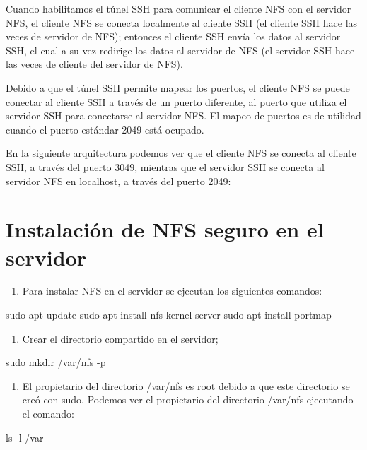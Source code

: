Cuando habilitamos el túnel SSH para comunicar el cliente NFS con el servidor NFS, el cliente NFS se conecta localmente al cliente SSH (el cliente SSH hace las veces de servidor de NFS); entonces el cliente SSH envía los datos al servidor SSH, el cual a su vez redirige los datos al servidor de NFS (el servidor SSH hace las veces de cliente del servidor de NFS).

Debido a que el túnel SSH permite mapear los puertos, el cliente NFS se puede conectar al cliente SSH a través de un puerto diferente, al puerto que utiliza el servidor SSH para conectarse al servidor NFS. El mapeo de puertos es de utilidad cuando el puerto estándar 2049 está ocupado.

En la siguiente arquitectura podemos ver que el cliente NFS se conecta al cliente SSH, a través del puerto 3049, mientras que el servidor SSH se conecta al servidor NFS en localhost, a través del puerto 2049:

\section{Instalación de NFS seguro en el servidor}

\begin{enumerate}
\item Para instalar NFS en el servidor se ejecutan los siguientes comandos:
\end{enumerate}

\begin{SourceCode}
sudo apt update
sudo apt install nfs-kernel-server
sudo apt install portmap
\end{SourceCode}

\begin{enumerate}
\item Crear el directorio compartido en el servidor;
\end{enumerate}

\begin{SourceCode}
sudo mkdir /var/nfs -p
\end{SourceCode}

\begin{enumerate}
\item El propietario del directorio /var/nfs es root debido a que este directorio se creó con sudo. Podemos ver el propietario del directorio /var/nfs ejecutando el comando:
\end{enumerate}

\begin{SourceCode}
ls -l /var
\end{SourceCode}

